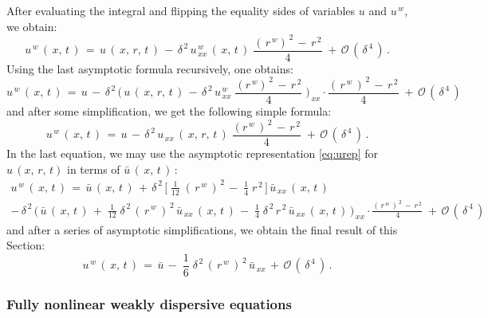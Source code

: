 \documentclass[alpha-refs, 12pt]{wiley-article}
\renewcommand{\O}{\mathcal{O}}
\begin{document}
After evaluating the integral and flipping the equality sides of variables $u$ and $u^{\,w}$, we obtain:
\begin{equation*}
  u^{\,w}\,(\,x,\,t\,)\, = \,u\,(\,x,\,r,\,t\,)\,-\,\delta^{\,2}\,u^{\,w}_{\,xx}\,(\,x,\,t\,)\;\frac{(\,r^{\,w})^{\,2}\,-\,r^{\,2}}{4}\; + \,\O\,(\,\delta^{\,4}\,)\,.
\end{equation*}
Using the last asymptotic formula recursively, one obtains:
\begin{equation*}
  u^{\,w}\,(\,x,\,t\,)\,=\,u\,-\,\delta^{\,2}\,\bigl(\,u\,(\,x,\,r,\,t\,)\,-\,\delta^{\,2}\,u^{\,w}_{\,xx}\;\frac{(r^{\,w})^{\,2}\,-\,r^{\,2}}{4}\;\bigr)_{\,xx}\cdot\frac{(\,r^{\,w}\,)^{\,2}\,-\,r^{\,2}}{4}\;+\,\O\,(\,\delta^{\,4}\,)
\end{equation*}
and after some simplification, we get the following simple formula:
\begin{equation*}
  u^{\,w}\,(\,x,\,t\,)\,=\,u\,-\,\delta^{\,2}\,u_{\,xx}\,(\,x,\,r,\,t\,)\;\frac{(r^{\,w}\,)^{\,2}\,-\,r^{\,2}}{4}\;+\,\O\,(\,\delta^{\,4}\,)\,.
\end{equation*}
In the last equation, we may use the asymptotic representation \eqref{eq:urep} for $u\,(x,\,r,\,t)$ in terms of $\bar{u}\,(\,x,\,t\,)\,$:
\begin{multline*}
  u^{\,w}\,(\,x,\,t\,)\,=\,\bar{u}\,(\,x,\,t\,)\,+\,\delta^{\,2}\,\bigl[\;\frac{1}{12}\;(\,r^{\,w}\,)^{\,2}\,-\;\frac{1}{4}\;r^{\,2}\,\bigr]\,\bar{u}_{\,xx}\,(\,x,\,t\,)\\ 
  -\,\delta^{\,2}\,\bigr(\,\bar{u}\,(\,x,\,t\,)\, +\;\frac{1}{12}\;\delta^{\,2}\,(\,r^{\,w}\,)^{\,2}\,\bar{u}_{\,xx}\,(\,x,\,t\,)\,-\;\frac{1}{4}\;\delta^{\,2}\,r^{\,2}\,\bar{u}_{\,xx}\,(\,x,\,t\,)\,\bigr)_{\,xx}\cdot\frac{(\,r^{\,w}\,)^{\,2}\,-\,r^{\,2}}{\,4}\;+\,\O\,(\,\delta^{\,4}\,)
\end{multline*}
and after a series of asymptotic simplifications, we obtain the final result of this Section:
\begin{equation*}
  u^{\,w}\,(\,x,\,t\,)\,=\,\bar{u}\, - 
  \;\frac{1}{6}\;\delta^{\,2}\,(\,r^{\,w}\,)^{\,2}\,\bar{u}_{\,xx}\, + \,\O\,(\,\delta^{\,4}\,)\,.
\end{equation*}

\subsubsection{Fully nonlinear weakly dispersive equations}
\end{document}
